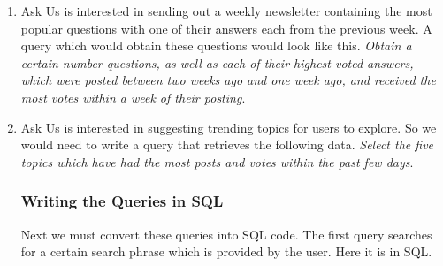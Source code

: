 \begin{enumerate}
	\item
	Ask Us is interested in sending out a weekly newsletter containing the most popular questions with one of their answers each from the previous week. A query which would obtain these questions would look like this. \emph{Obtain a certain number questions, as well as each of their highest voted answers, which were posted between two weeks ago and one week ago, and received the most votes within a week of their posting}.

	\item
	Ask Us is interested in suggesting trending topics for users to explore. So we would need to write a query that retrieves the following data. \emph{Select the five topics which have had the most posts and votes within the past few days}.

	\subsubsection{Writing the Queries in SQL}

	Next we must convert these queries into SQL code. The first query searches for a certain search phrase which is provided by the user. Here it is in SQL.


\end{enumerate}